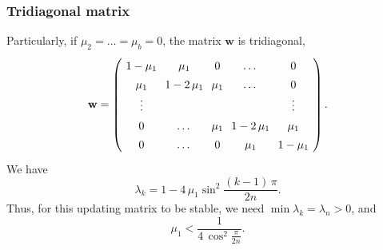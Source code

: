 \documentclass[reprint]{revtex4-1}
\begin{document}
\subsubsection{Tridiagonal matrix}



Particularly, if $\mu_2 = \dots = \mu_b = 0$,
the matrix $\mathbf w$ is tridiagonal,
%
\begin{equation}
\arraycolsep=3.6pt\def\arraystretch{1.4}
\mathbf w
=
\left(
  \begin{array}{cccccccc}
    1 - \mu_1   & \mu_1 & 0 & \dots & 0 \\
    \mu_1 & 1 - 2 \, \mu_1  & \mu_1 & \dots & 0 \\
    \vdots & &  & & \vdots \\
    0 & \dots & \mu_1 & 1 - 2 \, \mu_1  & \mu_1 \\
    0 & \dots & 0 & \mu_1 & 1 - \mu_1
  \end{array}
\right).
\label{eq:wtridiag}
\end{equation}
%
We have
\begin{equation}
  \lambda_k = 1 - 4 \, \mu_1 \sin^2 \frac{(k - 1) \, \pi}{2n}.
\label{eq:wtridiag_eigenvalue}
\end{equation}
%
Thus, for this updating matrix to be stable,
we need
$\min \lambda_k = \lambda_n > 0$,
and
$$
\mu_1 < \frac{1}{4 \, \cos^2\frac{\pi}{2n} }.
$$
\end{document}
